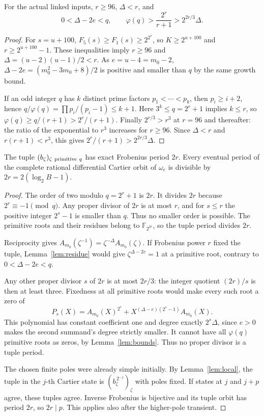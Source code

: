 \documentclass[11pt]{article}
\begin{document}
\begin{lemma}\label{lem:bounds}
For the actual linked inputs, $r\ge96$, $\Delta<r$, and
\[
 0<\Delta-2e<q,\qquad
 \varphi(q)>\frac{2^r}{r+1}>2^{2r/3}\Delta.
\]
\end{lemma}
\begin{proof}
For $s=u+100$, $F_5(s)\ge F_1(s)\ge2^{2^s}$, so
$K\ge2^{u+100}$ and $r\ge2^{u+100}-1$.
These inequalities imply $r\ge96$ and
$\Delta=(u-2)(u-1)/2<r$.
As $e=u-4=m_0-2$,
$\Delta-2e=(m_0^2-3m_0+8)/2$ is positive and smaller
than $q$ by the same growth bound.

If an odd integer $q$ has $k$ distinct prime factors
$p_1<\cdots<p_k$, then $p_i\ge i+2$, hence
$q/\varphi(q)=\prod p_i/(p_i-1)\le k+1$.
Here $3^k\le q=2^r+1$ implies $k\le r$, so
$\varphi(q)\ge q/(r+1)>2^r/(r+1)$.
Finally $2^{r/3}>r^3$ at $r=96$ and thereafter:
the ratio of the exponential to $r^3$ increases for $r\ge96$.
Since $\Delta<r$ and $r(r+1)<r^3$, this gives
$2^r/(r+1)>2^{2r/3}\Delta$.
\end{proof}

\begin{theorem}\label{thm:actual-period}
The tuple $(b_\zeta)_{\zeta\ {\rm primitive}\ q}$ has exact
Frobenius period $2r$. Every eventual period of the complete
rational differential Cartier orbit of $\omega_e$ is divisible
by $2r=2(\log_2 B-1)$.
\end{theorem}
\begin{proof}
The order of two modulo $q=2^r+1$ is $2r$.
It divides $2r$ because $2^r\equiv-1\pmod q$.
Any proper divisor of $2r$ is at most $r$, and for
$s\le r$ the positive integer $2^s-1$ is smaller than $q$.
Thus no smaller order is possible. The primitive roots and their
residues belong to $\mathbb F_{2^{2r}}$, so the tuple period
divides $2r$.

Reciprocity gives
$A_{m_0}(\zeta^{-1})=\zeta^{-\Delta}A_{m_0}(\zeta)$.
If Frobenius power $r$ fixed the tuple,
Lemma~\ref{lem:residue} would give
$\zeta^{\Delta-2e}=1$ at a primitive root, contrary to
$0<\Delta-2e<q$.

Any other proper divisor $s$ of $2r$ is at most $2r/3$:
the integer quotient $(2r)/s$ is then at least three.
Fixedness at all primitive roots would make every such root a zero of
\[
 P_s(X)=A_{m_0}(X)^{2^s}
       +X^{(\Delta-e)(2^s-1)}A_{m_0}(X).
\]
This polynomial has constant coefficient one and degree exactly
$2^s\Delta$, since $e>0$ makes the second summand's degree
strictly smaller. It cannot have all $\varphi(q)$ primitive roots
as zeros, by Lemma~\ref{lem:bounds}. Thus no proper divisor is a
tuple period.

The chosen finite poles were already simple initially.
By Lemma~\ref{lem:local}, the tuple in the $j$-th Cartier state is
$(b_\zeta^{\,2^{-j}})_\zeta$ with poles fixed. If states at
$j$ and $j+p$ agree, these tuples agree. Inverse Frobenius is
bijective and its tuple orbit has period $2r$, so $2r\mid p$.
This applies also after the higher-pole transient.
\end{proof}
\end{document}
